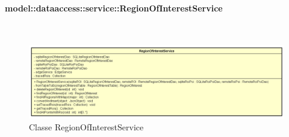 \documentclass[../DefinizioneDiProdotto.tex]{subfiles}
\begin{document}
\paragraph{model::dataaccess::service::RegionOfInterestService}
\
\begin{figure}[H]
	\centering
	\includegraphics[width=\maxwidth]{img/RegionOfInterestService.png}
	\caption{Classe RegionOfInterestService}\label{fig:model::dataaccess::service::RegionOfInterestService} 
\end{figure}
\end{document}
